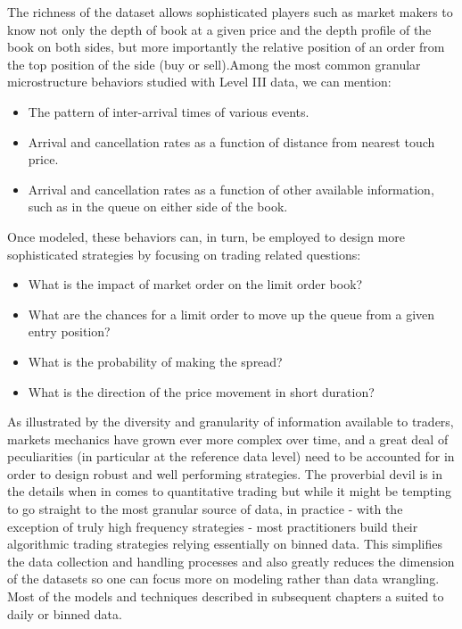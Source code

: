The richness of the dataset allows sophisticated players such as market makers to know not only the depth of book at a given price and the depth profile of the book on both sides, but more importantly the relative position of an order from the top position of the side (buy or sell).Among the most common granular microstructure behaviors studied with Level III data, we can mention:
        \begin{itemize}
        \item The pattern of inter-arrival times of various events.
        \item Arrival and cancellation rates as a function of distance from nearest touch price.
        \item Arrival and cancellation rates as a function of other available information, such as in the queue on either side of the book.
        \end{itemize}
Once modeled, these behaviors can, in turn, be employed to design more sophisticated strategies by focusing on trading related questions:
        \begin{itemize}
        \item What is the impact of market order on the limit order book?
        \item What are the chances for a limit order to move up the queue from a given entry position?
        \item What is the probability of making the spread?
        \item What is the direction of the price movement in short duration?
        \end{itemize}

As illustrated by the diversity and granularity of information available to traders, markets mechanics have grown ever more complex over time, and a great deal of peculiarities (in particular at the reference data level) need to be accounted for in order to design robust and well performing strategies. The proverbial devil is in the details when in comes to quantitative trading but while it might be tempting to go straight to the most granular source of data, in practice - with the exception of truly high frequency strategies - most practitioners build their algorithmic trading strategies relying essentially on binned data. This simplifies the data collection and handling processes and also greatly reduces the dimension of the datasets so one can focus more on modeling rather than data wrangling. Most of the models and techniques described in subsequent chapters a suited to daily or binned data.



